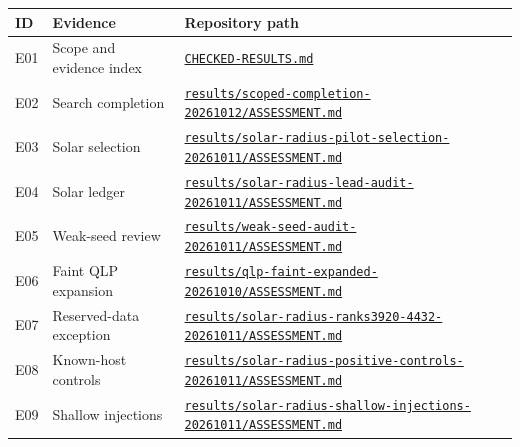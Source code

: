 \footnotesize
\begin{longtable}{@{}>{\raggedright\arraybackslash}p{}>{\raggedright\arraybackslash}p{}>{\raggedright\arraybackslash}p{}@{}}
\toprule ID & Evidence & Repository path \\
\midrule\endhead
E01 & Scope and evidence index & \href{https://github.com/relh/exoplanet/blob/0537d585d10e428fad63b4b38f5b9822590b271a/CHECKED-RESULTS.md}{\nolinkurl{CHECKED-RESULTS.md}} \\
E02 & Search completion & \href{https://github.com/relh/exoplanet/blob/0537d585d10e428fad63b4b38f5b9822590b271a/results/scoped-completion-20261012/ASSESSMENT.md}{\nolinkurl{results/scoped-completion-20261012/ASSESSMENT.md}} \\
E03 & Solar selection & \href{https://github.com/relh/exoplanet/blob/0537d585d10e428fad63b4b38f5b9822590b271a/results/solar-radius-pilot-selection-20261011/ASSESSMENT.md}{\nolinkurl{results/solar-radius-pilot-selection-20261011/ASSESSMENT.md}} \\
E04 & Solar ledger & \href{https://github.com/relh/exoplanet/blob/0537d585d10e428fad63b4b38f5b9822590b271a/results/solar-radius-lead-audit-20261011/ASSESSMENT.md}{\nolinkurl{results/solar-radius-lead-audit-20261011/ASSESSMENT.md}} \\
E05 & Weak-seed review & \href{https://github.com/relh/exoplanet/blob/0537d585d10e428fad63b4b38f5b9822590b271a/results/weak-seed-audit-20261011/ASSESSMENT.md}{\nolinkurl{results/weak-seed-audit-20261011/ASSESSMENT.md}} \\
E06 & Faint QLP expansion & \href{https://github.com/relh/exoplanet/blob/0537d585d10e428fad63b4b38f5b9822590b271a/results/qlp-faint-expanded-20261010/ASSESSMENT.md}{\nolinkurl{results/qlp-faint-expanded-20261010/ASSESSMENT.md}} \\
E07 & Reserved-data exception & \href{https://github.com/relh/exoplanet/blob/0537d585d10e428fad63b4b38f5b9822590b271a/results/solar-radius-ranks3920-4432-20261011/ASSESSMENT.md}{\nolinkurl{results/solar-radius-ranks3920-4432-20261011/ASSESSMENT.md}} \\
E08 & Known-host controls & \href{https://github.com/relh/exoplanet/blob/0537d585d10e428fad63b4b38f5b9822590b271a/results/solar-radius-positive-controls-20261011/ASSESSMENT.md}{\nolinkurl{results/solar-radius-positive-controls-20261011/ASSESSMENT.md}} \\
E09 & Shallow injections & \href{https://github.com/relh/exoplanet/blob/0537d585d10e428fad63b4b38f5b9822590b271a/results/solar-radius-shallow-injections-20261011/ASSESSMENT.md}{\nolinkurl{results/solar-radius-shallow-injections-20261011/ASSESSMENT.md}} \\

\end{longtable}
